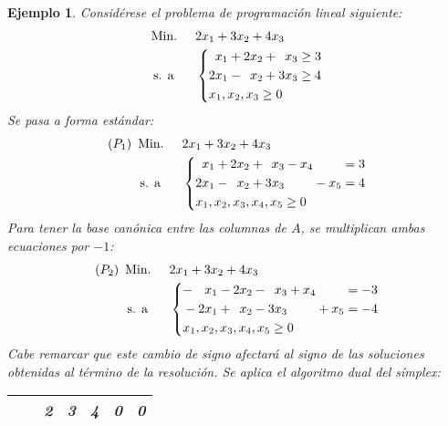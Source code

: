\documentclass[11pt]{report}
\theoremstyle{mytheorem}
\theoremstyle{mydefinition}
\theoremstyle{myexample}
\newtheorem*{example}{Ejemplo}
\begin{document}
\begin{example}
Considérese el problema de programación lineal siguiente:
\[\begin{aligned}[t]
&\text{Min. } && 2x_1+3x_2+4x_3 \\
& \, \text{s. a} &&\left\{\begin{alignedat}{10}
& &x_1 & {}+{} & 2&x_2 & {}+{} &  &x_3 & {}\geq{} & 3 \\
&2&x_1 & {}-{} &  &x_2 & {}+{} & 3&x_3 & {}\geq{} & 4  \\
&\mathrlap{x_1,x_2,x_3 \geq 0}
\end{alignedat}\right.
\end{aligned}\]
Se pasa a forma estándar:
\[\begin{aligned}[t]
(P_1)\ \,&\text{Min. } && 2x_1+3x_2+4x_3 \\
& \, \text{s. a} &&\left\{\begin{alignedat}{10}
& &x_1 & {}+{} & 2&x_2 & {}+{} &  &x_3 & {}-{} & x_4 &       &     & {}={} & 3 \\
&2&x_1 & {}-{} &  &x_2 & {}+{} & 3&x_3 &       &     & {}-{} & x_5 & {}={} & 4  \\
&\mathrlap{x_1,x_2,x_3,x_4,x_5 \geq 0}
\end{alignedat}\right.
\end{aligned}\]
Para tener la base canónica entre las columnas de $A$, se multiplican ambas ecuaciones por $-1$:
\[\begin{aligned}[t]
(P_2)\ \,&\text{Min. } && 2x_1+3x_2+4x_3 \\
& \, \text{s. a} &&\left\{\begin{alignedat}{10}
& -&x_1 & {}-{} & 2&x_2 & {}-{} &  &x_3 & {}+{} & x_4 &       &     & {}={} & -3 \\
&-2&x_1 & {}+{} &  &x_2 & {}-{} & 3&x_3 &       &     & {}+{} & x_5 & {}={} & -4  \\
&\mathrlap{x_1,x_2,x_3,x_4,x_5 \geq 0}
\end{alignedat}\right.
\end{aligned}\]
Cabe remarcar que este cambio de signo afectará al signo de las soluciones obtenidas al término de la resolución. Se aplica el algoritmo dual del símplex:
\begin{center}
\begin{tabular}{|c|c|c|c|c|c|c|}
    \cline{3-7}
    \multicolumn{1}{c}{} & \multicolumn{1}{c|}{} & \multicolumn{1}{c}{\phantom{-}2} & \multicolumn{1}{c}{\phantom{-}3} & \multicolumn{1}{c}{\phantom{-}4} & \multicolumn{1}{c}{\phantom{-}0} & \multicolumn{1}{c|}{\phantom{-}0} \\ \hline
    

\end{tabular}
\end{center}
\end{example}
\end{document}
